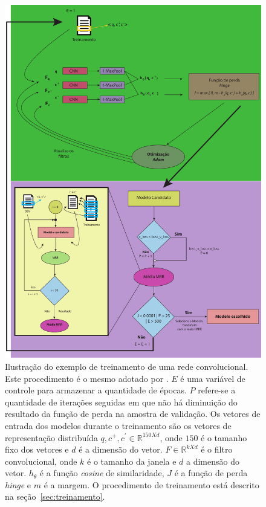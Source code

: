 \begin{figure}[p]
\centering
\includegraphics[height=1.3\textwidth]{figuras/cap-experimento/evaluation_process.pdf}
\caption{Ilustração do exemplo de treinamento de uma rede convolucional. Este procedimento é o mesmo adotado por \cite{iyer-etal-2016-summarizing}. $E$ é uma variável de controle para armazenar a quantidade de épocas. $P$ refere-se a quantidade de iterações seguidas em que não há diminuição do resultado da função de perda na amostra de validação. Os vetores de entrada dos modelos durante o treinamento são os vetores de representação distribuída $q, c^{+}, c^{'} \in \mathbb{R}^{150 X d}$, onde $150$ é o tamanho fixo dos vetores e $d$ é a dimensão do vetor. $F \in \mathbb{R}^{k X d}$ é o filtro convolucional, onde $k$ é o tamanho da janela e $d$ a dimensão do vetor. $h_{\theta}$ é a função \textit{cosine} de similaridade, $J$ é a função de perda \textit{hinge} e $m$ é a margem. O procedimento de treinamento está descrito na seção~\ref{sec:treinamento}.}
\label{fig:evaluation-process}
\end{figure}

